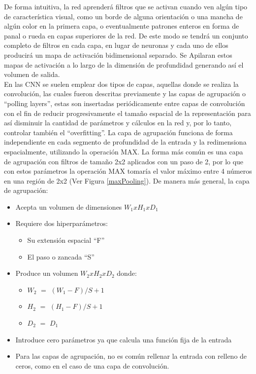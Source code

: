 De forma intuitiva, la red aprenderá filtros que se activan cuando ven algún tipo de característica visual, como un borde de alguna orientación o una mancha de algún color en la primera capa, o eventualmente patrones enteros en forma de panal o rueda en capas superiores de la red. De este modo se tendrá un conjunto completo de filtros en cada capa, en lugar de neuronas y cada uno de ellos producirá un mapa de activación bidimensional separado. Se Apilaran estos mapas de activación a lo largo de la dimensión de profundidad generando así el volumen de salida\cite{CS231n}.
\\ 
En las CNN se suelen emplear dos tipos de capas, aquellas donde se realiza la convolución, las cuales fueron descritas previamente y las capas de agrupación o ``polling layers'', estas son insertadas periódicamente entre capas de convolución con el fin de reducir progresivamente el tamaño espacial de la representación para así disminuir la cantidad de parámetros y cálculos en la red y, por lo tanto, controlar también el ``overfitting''. La capa de agrupación funciona de forma independiente  en cada segmento de profundidad de la entrada y la redimensiona espacialmente, utilizando la operación MAX. La forma más común es una capa de agrupación con filtros de tamaño 2x2 aplicados con un paso de 2, por lo que con estos parámetros la operación MAX tomaría el valor máximo entre 4 números en una región de 2x2 (Ver Figura \ref{maxPooling}). De manera más general, la capa de agrupación:
\begin{itemize}
    \item Acepta un volumen de dimensiones $W_{1}xH_{1}xD_{1}$
    \item Requiere dos hiperparámetros:
    \begin{itemize}
        \item Su extensión espacial ``F''
        \item El paso o zancada ``S''
    \end{itemize}
    \item Produce un volumen $W_{2}xH_{2}xD_{2}$ donde:
    \begin{itemize}
        \item $W_{2}$ $=$ $(W_{1}-F)/S+1$
        \item $H_{2}$ $=$ $(H_{1}-F)/S+1$
        \item $D_{2}$ $=$ $D_{1}$
    \end{itemize}
    \item Introduce cero parámetros ya que calcula una función fija de la entrada
    \item Para las capas de agrupación, no es común rellenar la entrada con relleno de ceros, como en el caso de una capa de convolución.
\end{itemize}
